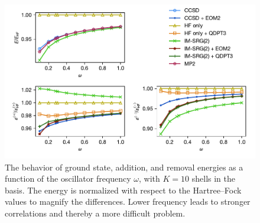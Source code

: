\begin{figure}
  \centering \includegraphics{fig-by-freq-10-6-normal.pdf} \caption{The
  behavior of ground state, addition, and removal energies as a
  function of the oscillator frequency $\omega$, with $K = 10$ shells
  in the basis.  The energy is normalized with respect to the
  Hartree--Fock values to magnify the differences.  Lower frequency
  leads to stronger correlations and thereby a more difficult problem.}
  \label{fig:by-freq-10-6-normal}
\end{figure}

